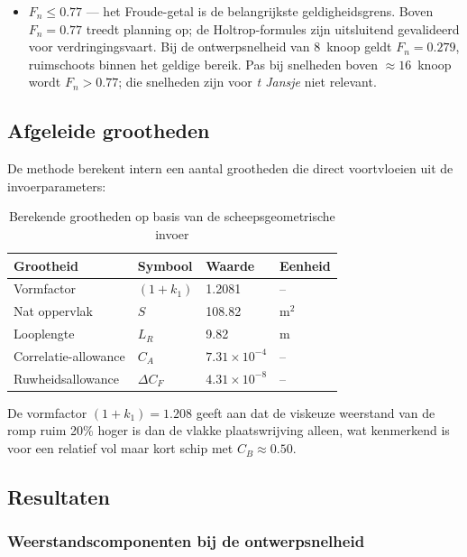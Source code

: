 \begin{itemize}
    \item \textbf{$F_n \leq 0.77$} --- het Froude-getal is de belangrijkste geldigheidsgrens. Boven $F_n = 0.77$ treedt planning op; de Holtrop-formules zijn uitsluitend gevalideerd voor verdringingsvaart. Bij de ontwerpsnelheid van 8~knoop geldt $F_n = 0.279$, ruimschoots binnen het geldige bereik. Pas bij snelheden boven $\approx 16$~knoop wordt $F_n > 0.77$; die snelheden zijn voor \emph{t Jansje} niet relevant.
\end{itemize}

\subsection{Afgeleide grootheden}

De methode berekent intern een aantal grootheden die direct voortvloeien uit de invoerparameters:

\begin{table}[h!]
\centering
\caption{Berekende grootheden op basis van de scheepsgeometrische invoer}
\label{tab:holtrop_derived}
\begin{tabular}{llll}
\toprule
Grootheid & Symbool & Waarde & Eenheid \\
\midrule
Vormfactor            & $(1+k_1)$    & 1.2081                & --      \\
Nat oppervlak         & $S$          & 108.82                & m$^2$   \\
Looplengte            & $L_R$        & 9.82                  & m       \\
Correlatie-allowance  & $C_A$        & $7.31 \times 10^{-4}$ & --      \\
Ruwheidsallowance     & $\Delta C_F$ & $4.31 \times 10^{-8}$ & --      \\
\bottomrule
\end{tabular}
\end{table}

De vormfactor $(1+k_1) = 1.208$ geeft aan dat de viskeuze weerstand van de romp ruim 20\% hoger is dan de vlakke plaatswrijving alleen, wat kenmerkend is voor een relatief vol maar kort schip met $C_B \approx 0.50$.

\newpage
\subsection{Resultaten}

\subsubsection{Weerstandscomponenten bij de ontwerpsnelheid}

